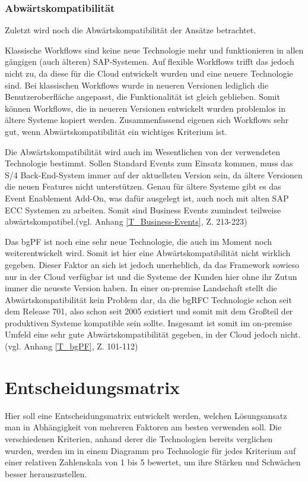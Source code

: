 \subsubsection{Abwärtskompatibilität}

Zuletzt wird noch die Abwärtskompatibilität der Ansätze betrachtet. 

Klassische Workflows sind keine neue Technologie mehr und funktionieren in allen gängigen (auch älteren) SAP-Systemen. Auf flexible Workflows trifft das jedoch nicht zu, da diese für die Cloud entwickelt wurden und eine neuere Technologie sind. Bei klassischen Workflows wurde in neueren Versionen lediglich die Benutzeroberfläche angepasst, die Funktionalität ist gleich geblieben. Somit können Workflows, die in neueren Versionen entwickelt wurden problemlos in ältere Systeme kopiert werden. Zusammenfassend eigenen sich Workflows sehr gut, wenn Abwärtskompatibilität ein wichtiges Kriterium ist.

Die Abwärtskompatibilität wird auch im Wesentlichen von der verwendeten Technologie bestimmt. Sollen Standard Events zum Einsatz kommen, muss das S/4 Back-End-System immer auf der aktuellsten Version sein, da ältere Versionen die neuen Features nicht unterstützen. Genau für ältere Systeme gibt es das Event Enablement Add-On, was dafür ausgelegt ist, auch noch mit alten SAP ECC Systemen zu arbeiten. Somit sind Business Events zumindest teilweise abwärtskompatibel.(vgl. Anhang \ref{T_Business-Events}, Z. 213-223)

Das bgPF ist noch eine sehr neue Technologie, die auch im Moment noch weiterentwickelt wird. Somit ist hier eine Abwärtskompatibilität nicht wirklich gegeben. Dieser Faktor an sich ist jedoch unerheblich, da das Framework sowieso nur in der Cloud verfügbar ist und die Systeme der Kunden hier ohne ihr Zutun immer die neueste Version haben. In einer on-premise Landschaft stellt die Abwärtskompatibilität kein Problem dar, da die bgRFC Technologie schon seit dem Release 701, also schon seit 2005 existiert und somit mit dem Gro{\ss}teil der produktiven Systeme kompatible sein sollte. Insgesamt ist somit im on-premise Umfeld eine sehr gute Abwärtskompatibilität gegeben, in der Cloud jedoch nicht. (vgl. Anhang \ref{T_bgPF}, Z. 101-112)

\section{Entscheidungsmatrix}

Hier soll eine Entscheidungsmatrix entwickelt werden, welchen Lösungsansatz man in Abhängigkeit von mehreren Faktoren am besten verwenden soll. Die verschiedenen Kriterien, anhand derer die Technologien bereits verglichen wurden, werden im in einem Diagramm pro Technologie für jedes Kriterium auf einer relativen Zahlenskala von 1 bis 5 bewertet, um ihre Stärken und Schwächen besser herauszustellen.

